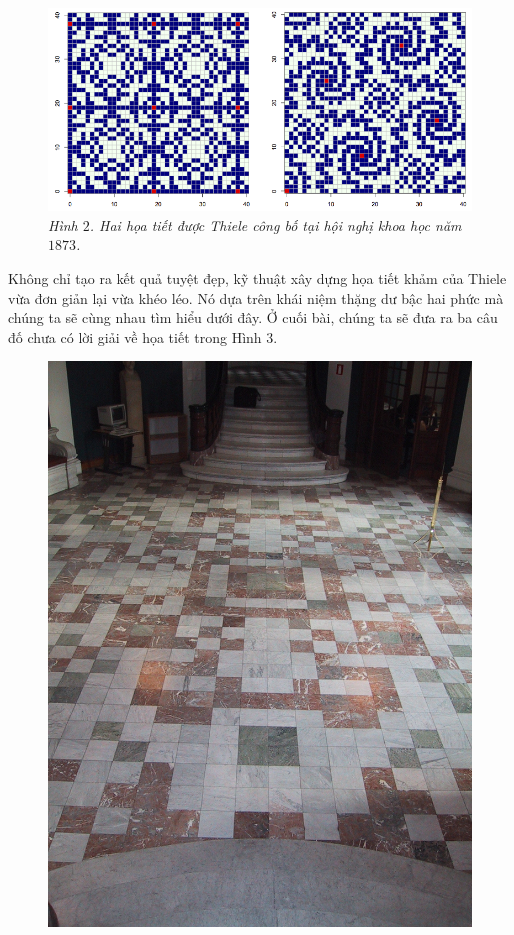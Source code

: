\begin{multicols}{2}
	\begin{figure}[H]
		\vspace*{-5pt}
		\centering
		\captionsetup{labelformat= empty, justification=centering}
		\includegraphics[width= 0.9\linewidth]{mosaique-2.png}
		\caption{\small\textit{\color{toanhocdoisong}Hình $2$. Hai họa tiết được Thiele công bố tại hội nghị khoa học năm $1873$.}}
		\vspace*{-5pt}
	\end{figure}
	Không chỉ tạo ra kết quả tuyệt đẹp, kỹ thuật xây dựng họa tiết khảm của Thiele vừa đơn giản lại vừa khéo léo. Nó dựa trên khái niệm thặng dư bậc hai phức mà chúng ta sẽ cùng nhau tìm hiểu dưới đây. Ở cuối bài, chúng ta sẽ đưa ra ba câu đố chưa có lời giải về họa tiết trong Hình $3$.
	\begin{figure}[H]
		\vspace*{-5pt}
		\centering
		\captionsetup{labelformat= empty, justification=centering}
		\includegraphics[width= 0.65\linewidth]{mosaique-3}

\end{figure}
\end{multicols}
